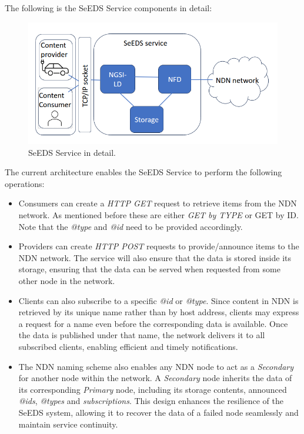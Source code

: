 \documentclass{article}
\begin{document}
\pagebreak

The following is the SeEDS Service components in detail: 

\begin{figure}[H]
    \centering
    \includegraphics[width=0.8\linewidth]{images/seeds_service_detail.png}
    \caption{SeEDS Service in detail.}
    \label{fig:seeds_service_detail}
\end{figure}

The current architecture enables the SeEDS Service to perform the following operations: 

\begin{itemize}
    \item Consumers can create a \textit{HTTP GET} request to retrieve items from the NDN network. As mentioned before these are either \emph{GET by TYPE} or {GET by ID}. Note that the \textit{@type} and \textit{@id} need to be provided accordingly. 
    \item Providers can create \textit{HTTP POST} requests to provide/announce items to the NDN network. The service will also ensure that the data is stored inside its storage, ensuring that the data can be served when requested from some other node in the network. 
    \item Clients can also subscribe to a specific \textit{@id} or \textit{@type}. Since content in NDN is retrieved by its unique name rather than by host address, clients may express a request for a name even before the corresponding data is available. Once the data is published under that name, the network delivers it to all subscribed clients, enabling efficient and timely notifications.
    \item The NDN naming scheme also enables any NDN node to act as a \emph{Secondary} for another node within the network. A \emph{Secondary} node inherits the data of its corresponding \emph{Primary} node, including its storage contents, announced \textit{@ids}, \textit{@types} and \textit{subscriptions}. This design enhances the resilience of the SeEDS system, allowing it to recover the data of a failed node seamlessly and maintain service continuity.
\end{itemize}
\end{document}
